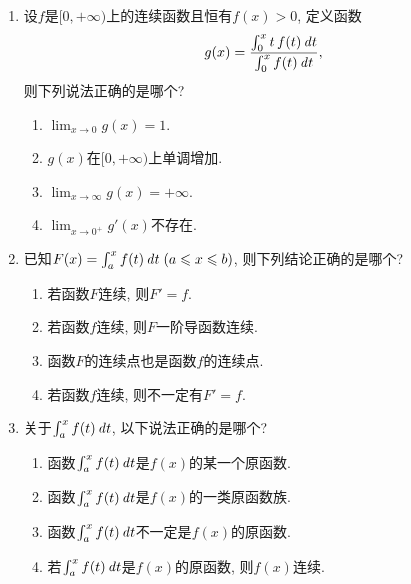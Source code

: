 \documentclass[a4paper,punct=CCT]{ctexbook}
\theoremstyle{break}
\newif\ifshowsol
\let\leq\leqslant
\let\le\leq
\begin{document}
\begin{enumerate}
\item 设\(f\)是\([0,+\infty)\)上的连续函数且恒有\(f(x) > 0\), 定义函数
  \[
    g(x) = \frac{\int_0^x t\,f(t) \mathop{}\!\mathit{d} t}{\int_0^x f(t) \mathop{}\!\mathit{d} t},
  \]
  则下列说法正确的是哪个?
  \begin{enumerate}
  \item \(\displaystyle \lim_{x\to0} g(x) = 1\).
  \item \(g(x)\)在\([0,+\infty)\)上单调增加.
  \item \(\displaystyle \lim_{x\to\infty} g(x) = +\infty\).
  \item \(\displaystyle \lim_{x\to0^+} g'(x)\)不存在.
  \end{enumerate}

  \ifshowsol
  易证\(\lim_{x\to0} g(x) = 0\)和\(\lim_{x\to0^+} g'(x) = 1/2\).  设\(f(t) = e^{-t}\), 那么这个函数就是\enumparen{c}的反例, 因为\(\lim_{x\to\infty} g(x) = 1\).  对于\(g\)求导, 有
  \[
    g'(x) = \frac{x\,f(x) \int_0^x f(t) \dt - f(x) \int_0^x t\,f(t) \dt}{\paren[\big]{\int_0^x f(t) \dt}^2}
    = f(x) \frac{\int_0^x (x-t)\,f(t) \dt}{\paren[\big]{\int_0^x f(t) \dt}^2}.
  \]
  对于所有的\(t \in (0, x)\), 都有\(x - t > 0\)和\(f(t) > 0\), 所以\(\int_0^x (x-t)\,f(t) \dt > 0\).  这就是说在\((0,+\infty)\)上\(g'(x) > 0\), 所以\(g(x)\)在\([0,+\infty)\)上单调增加.
  \fi

\item 已知\(F(x) = \int_a^x f(t) \dt \; (a \le x \le b)\), 则下列结论正确的是哪个?
  \begin{enumerate}
  \item 若函数\(F\)连续, 则\(F' = f\).
  \item 若函数\(f\)连续, 则\(F\)一阶导函数连续.
  \item 函数\(F\)的连续点也是函数\(f\)的连续点.
  \item 若函数\(f\)连续, 则不一定有\(F' = f\).
  \end{enumerate}

\item 关于\(\int_a^x f(t) \mathop{}\!\mathit{d} t\), 以下说法正确的是哪个?
  \begin{enumerate}
  \item 函数\(\int_a^x f(t) \mathop{}\!\mathit{d} t\)是\(f(x)\)的某一个原函数.
  \item 函数\(\int_a^x f(t) \mathop{}\!\mathit{d} t\)是\(f(x)\)的一类原函数族.
  \item 函数\(\int_a^x f(t) \mathop{}\!\mathit{d} t\)不一定是\(f(x)\)的原函数.
  \item 若\(\int_a^x f(t) \mathop{}\!\mathit{d} t\)是\(f(x)\)的原函数, 则\(f(x)\)连续.
  \end{enumerate}


\end{enumerate}
\end{document}
